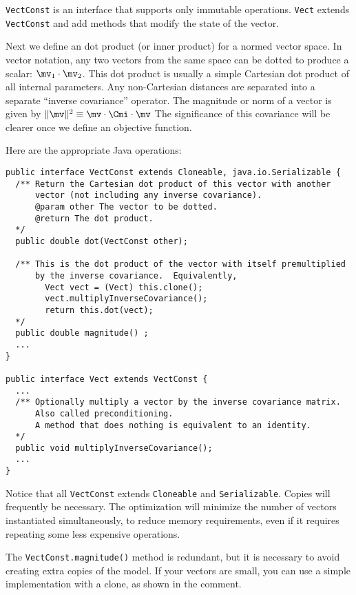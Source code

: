 \documentclass[12pt]{article}
\begin{document}
\texttt{VectConst} is an interface that
supports only immutable operations.
\texttt{Vect} extends \texttt{VectConst} and
add methods that modify the state of the
vector.

Next we define an dot product (or inner
product) for a normed vector space.  In
vector notation, any two vectors from the
same space can be dotted to produce a scalar:
$\mv_1 \cdot \mv_2$.  This dot product is
usually a simple Cartesian dot product of all
internal parameters.  Any non-Cartesian
distances are separated into a separate
``inverse covariance'' operator.  The
magnitude or norm of a vector is given by $\|
\mv \|^2 \equiv \mv \cdot \Cmi \cdot \mv$ The
significance of this covariance will be
clearer once we define an objective function.

Here are the appropriate Java operations:

{\footnotesize \begin{verbatim} 
public interface VectConst extends Cloneable, java.io.Serializable {
  /** Return the Cartesian dot product of this vector with another
      vector (not including any inverse covariance).
      @param other The vector to be dotted.
      @return The dot product.
  */
  public double dot(VectConst other);

  /** This is the dot product of the vector with itself premultiplied 
      by the inverse covariance.  Equivalently,
        Vect vect = (Vect) this.clone();
        vect.multiplyInverseCovariance();
        return this.dot(vect);
  */
  public double magnitude() ;
  ...
}

public interface Vect extends VectConst {
  ...
  /** Optionally multiply a vector by the inverse covariance matrix.
      Also called preconditioning.
      A method that does nothing is equivalent to an identity.
  */
  public void multiplyInverseCovariance();
  ...
}
\end{verbatim}}

\noindent Notice that all \texttt{VectConst}
extends \texttt{Cloneable} and
\texttt{Serializable}.  Copies will
frequently be necessary.  The optimization
will minimize the number of vectors
instantiated simultaneously, to reduce memory
requirements, even if it requires repeating
some less expensive operations.

The \texttt{VectConst.magnitude()} method is
redundant, but it is necessary to avoid
creating extra copies of the model.  If your
vectors are small, you can use a simple
implementation with a clone, as shown in the
comment.
\end{document}
